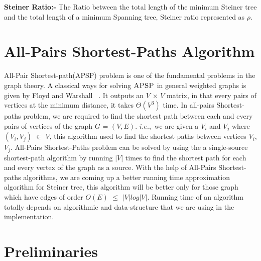 {\textbf{Steiner Ratio:-} The Ratio between the total length of the minimum Steiner tree and the total length of a minimum Spanning tree, Steiner ratio represented as $\rho$.
\section{All-Pairs Shortest-Paths Algorithm}

 All-Pair Shortest-path(APSP) problem is one of the fundamental problems in the graph theory. A classical ways for solving 
 $\textsc{APSP}$ in general weighted graphs is given by Floyd and Warshall ~\cite{cormen}. It outputs an $V$ $\times$ $V$ matrix, in that every pairs of vertices at the minimum distance, it takes $\Theta(V^3)$ time. In all-pairs Shortest-paths problem, 
 we are required to find the shortest path between each and every pairs of vertices of the graph $G$ = $(V,E)$. $i.e.,$ we are given a $V_i$ and $V_j$ where $(V_i,V_j)$ $\in$ $V$, this algorithm used to find the shortest paths between vertices $V_i$,$V_j$. All-Pairs Shortest-Paths problem can be solved by using the a single-source shortest-path algorithm by running $|V|$ times to find the shortest path for each and every vertex of the graph as a source. With the help of All-Pairs Shortest-paths
 algorithms, we are coming up a better running time approximation algorithm for Steiner tree, this algorithm will be better only for those graph which have edges of order $O(E)$ $\leq$ $|V|log|V|$. Running time of an algorithm totally depends 
 on algorithmic and data-structure that we are using in the implementation.   

\section{Preliminaries}

}
